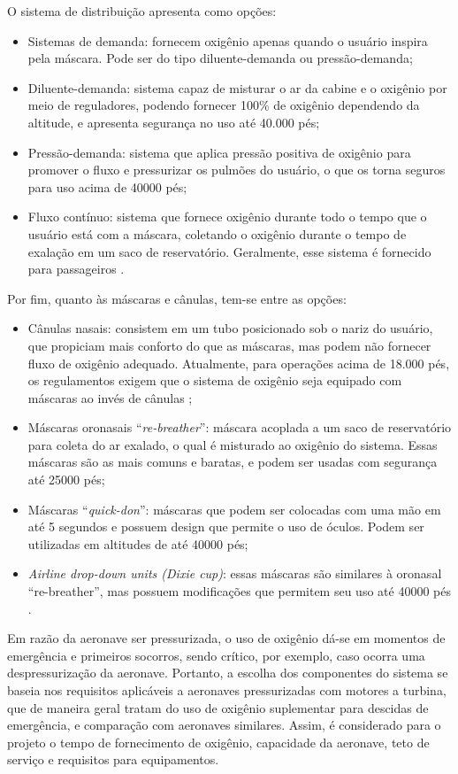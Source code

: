O sistema de distribuição apresenta como opções:
\begin{itemize}
    \item Sistemas de demanda: fornecem oxigênio apenas quando o usuário inspira pela máscara. Pode ser do tipo diluente-demanda ou pressão-demanda;
    \item Diluente-demanda: sistema capaz de misturar o ar da cabine e o oxigênio por meio de reguladores, podendo fornecer 100\% de oxigênio dependendo da altitude, e apresenta segurança no uso até 40.000 pés; 
    \item Pressão-demanda: sistema que aplica pressão positiva de oxigênio para promover o fluxo e pressurizar os pulmões do usuário, o que os torna seguros para uso acima de 40000 pés;
    \item Fluxo contínuo: sistema que fornece oxigênio durante todo o tempo que o usuário está com a máscara, coletando o oxigênio durante o tempo de exalação em um saco de reservatório. Geralmente, esse sistema é fornecido para passageiros \cite{SistemasANAC}.
\end{itemize}

Por fim, quanto às máscaras e cânulas, tem-se entre as opções:
\begin{itemize}
    \item Cânulas nasais: consistem em um tubo posicionado sob o nariz do usuário, que propiciam mais conforto do que as máscaras, mas podem não fornecer fluxo de oxigênio adequado. Atualmente, para operações acima de 18.000 pés, os regulamentos exigem que o sistema de oxigênio seja equipado com máscaras ao invés de cânulas \cite{SistemasANAC};
    \item Máscaras oronasais “\textit{re-breather}”: máscara acoplada a um saco de reservatório para coleta do ar exalado, o qual é misturado ao oxigênio do sistema. Essas máscaras são as mais comuns e baratas, e podem ser usadas com segurança até 25000 pés;
    \item Máscaras “\textit{quick-don}”: máscaras que podem ser colocadas com uma mão em até 5 segundos e possuem design que permite o uso de óculos. Podem ser utilizadas em altitudes de até 40000 pés;
    \item \textit{Airline drop-down units (Dixie cup)}: essas máscaras são similares à oronasal “re-breather”, mas possuem modificações que permitem seu uso até 40000 pés \cite{OxiEquip}.
\end{itemize}

Em razão da aeronave ser pressurizada, o uso de oxigênio dá-se em momentos de emergência e primeiros socorros, sendo crítico, por exemplo, caso ocorra uma despressurização da aeronave. Portanto, a escolha dos componentes do sistema se baseia nos requisitos aplicáveis a aeronaves pressurizadas com motores a turbina, que de maneira geral tratam do uso de oxigênio suplementar para descidas de emergência, e comparação com aeronaves similares. Assim, é considerado para o projeto o tempo de fornecimento de oxigênio, capacidade da aeronave, teto de serviço e requisitos para equipamentos.

